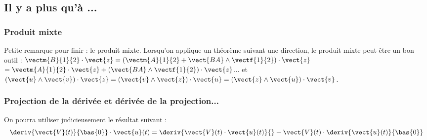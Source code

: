 \subsection{Il y a plus qu'à ...}
\subsubsection{Produit mixte}
Petite remarque pour finir : le produit mixte. Lorsqu'on applique un théorème suivant une direction, le produit mixte peut être un bon outil :
$\vectm{B}{1}{2}\cdot \vect{z} = \left( \vectm{A}{1}{2} + \vect{BA}\wedge \vectf{1}{2}\right)\cdot \vect{z}$
$=  \vectm{A}{1}{2}\cdot \vect{z} + \left(\vect{BA}\wedge \vectf{1}{2}\right)\cdot \vect{z}$...
et $\left(\vect{u} \wedge \vect{v}\right) \cdot \vect{z}= \left(\vect{v} \wedge \vect{z}\right) \cdot \vect{u}= \left(\vect{z} \wedge \vect{u}\right) \cdot \vect{v}$.

\subsubsection{Projection de la dérivée et dérivée de la projection...}
On pourra utiliser judicieusement le résultat suivant : 
$$
\deriv{\vect{V}(t)}{\bas{0}}\cdot \vect{u}(t) =
\deriv{\vect{V}(t) \cdot \vect{u}(t) }{} - \vect{V}(t) \cdot \deriv{\vect{u}(t)}{\bas{0}} 
$$